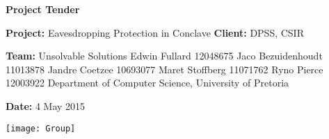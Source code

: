 \begin{titlepage}
	\begin{center}
		\large{\textbf{Project Tender}}\newline
	\end{center}
		\vfill
	\begin{center}
		\LARGE{\textbf{Project:}}\large{ Eavesdropping Protection in Conclave}\newline
		\textbf{Client:} DPSS, CSIR\newline
	\end{center}
		\vfill
	\begin{center}
		\LARGE{\textbf{Team:} Unsolvable Solutions}\newline
		\large{Edwin Fullard 12048675}\newline
		\large{Jaco Bezuidenhoudt 11013878}\newline
		\large{Jandre Coetzee 10693077}\newline
		\large{Maret Stoffberg 11071762}\newline
		\large{Ryno Pierce 12003922}\newline
		\small{Department of Computer Science, University of Pretoria}\newline
	\end{center}
		\vfill
	\begin{center}
		\large{\textbf{Date:} 4 May 2015}
	\end{center}
		\vfill
	\begin{center}
		\texttt{[image: Group]}
	\end{center}
\end{titlepage}
